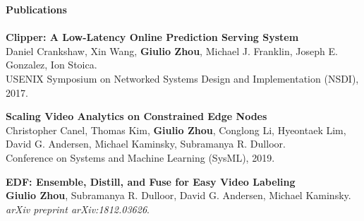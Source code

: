 \documentclass{article}
\begin{document}

\noindent
\textbf{\Large Publications}\\[-2mm]
\HRule\\
\noindent
\textbf{Clipper: A Low-Latency Online Prediction Serving System} \\
Daniel Crankshaw, Xin Wang, \textbf{Giulio Zhou}, Michael J. Franklin, Joseph E. Gonzalez, Ion Stoica. \\
USENIX Symposium on Networked Systems Design and Implementation (NSDI), 2017. \\
\vspace{-3mm}

\noindent
\textbf{Scaling Video Analytics on Constrained Edge Nodes} \\
Christopher Canel, Thomas Kim, \textbf{Giulio Zhou}, Conglong Li, Hyeontaek Lim, David G. Andersen, Michael Kaminsky, Subramanya R. Dulloor. \\
Conference on Systems and Machine Learning (SysML), 2019. \\
\vspace{-3mm}

\noindent
\textbf{EDF: Ensemble, Distill, and Fuse for Easy Video Labeling} \\
\textbf{Giulio Zhou}, Subramanya R. Dulloor, David G. Andersen, Michael Kaminsky. \textit{arXiv preprint arXiv:1812.03626}. \\
\end{document}
